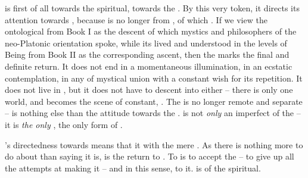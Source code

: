  is first of all  towards the {spiritual}, towards
the .
By this very token, it directs its attention towards , because
 is no longer  from , of which .  If we view the ontological  from Book I as
the descent of which mystics and philosophers of the neo-Platonic orientation
spoke, while its lived and understood  in the levels of Being
from Book II as the corresponding ascent, then the  marks
the final and definite return.  It
does not end in a momentaneous illumination, in an ecstatic contemplation, in
any  of mystical union with a constant wish for its
repetition.  It does not live in , but it does not have to
descent into  either -- there is only one world, and
 becomes the scene of constant, .
The  is no longer remote and separate --  is
nothing else than the attitude towards the . 
is not {\em only} an imperfect  of the  -- it is {\em the only}
, the only form of .

's directedness towards  means that it  with
the mere . As there is nothing more to do about
 than saying  it is,  is the 
return to . To  is to accept the  --
to give up all the attempts at making it  -- and in this sense, to
 it.
 is  of the spiritual.

